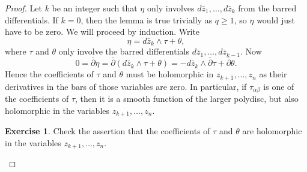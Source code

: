 \documentclass[12pt,openany]{book}
\theoremstyle{plain}
\theoremstyle{remark}
\theoremstyle{definition}
\newenvironment{exbox}{%
    \def\FrameCommand{\vrule width 1pt \relax\hspace{10pt}}%
    \MakeFramed{\advance\hsize-\width\FrameRestore}%
}{%
    \endMakeFramed
}
\theoremstyle{exercise}
\newtheorem{exercise}{Exercise}[section]
\theoremstyle{example}
\begin{document}
\begin{proof}
Let $k$ be an integer such that $\eta$ only involves
$d\bar{z}_1,\ldots,d\bar{z}_k$ from the barred differentials.
If $k=0$, then the lemma is true trivially as $q \geq 1$, so $\eta$ would
just have to be zero.
We will proceed by induction.
Write
\begin{equation*}
\eta = d\bar{z}_k \wedge \tau + \theta,
\end{equation*}
where $\tau$ and $\theta$ only involve the barred differentials
$d\bar{z}_1,\ldots,d\bar{z}_{k-1}$.
Now
\begin{equation*}
0 = \bar{\partial} \eta
= \bar{\partial} (d\bar{z}_k \wedge \tau + \theta)
= -d\bar{z}_k \wedge \bar{\partial} \tau + \bar{\partial} \theta .
\end{equation*}
Hence the coefficients of $\tau$ and $\theta$ must be holomorphic in
$z_{k+1},\ldots,z_n$ as their derivatives in the bars of those variables
are zero.
In particular, if $\tau_{\alpha \beta}$ is one of the coefficients
of $\tau$, then it is a smooth function of the larger polydisc, but also
holomorphic in the variables $z_{k+1},\ldots,z_{n}$.

\begin{exbox}
\begin{exercise}
Check the assertion that the coefficients of
$\tau$ and $\theta$ are holomorphic in the variables $z_{k+1},\ldots,z_n$.
\end{exercise}
\end{exbox}



\end{proof}
\end{document}
